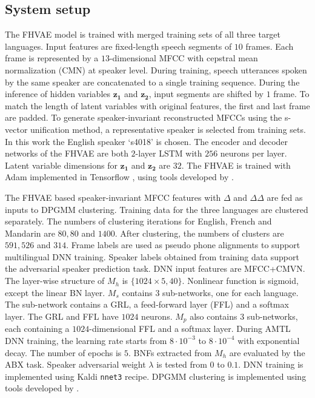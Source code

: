 \documentclass[a4paper]{article}
\begin{document}
\subsection{System setup}
\label{subsec:baseline}
The FHVAE model is trained with merged training sets of all three target languages.
Input features are fixed-length speech segments of $10$ frames. Each frame is represented by a $13$-dimensional MFCC with cepstral mean normalization (CMN) at speaker level. During training, speech utterances spoken by the same speaker are concatenated to a single training sequence. During the inference of hidden variables $\bm{z_1}$ and $\bm{z_2}$, input segments are shifted by $1$ frame. To match the length of latent variables with original features, the first and last frame are padded. 
To generate speaker-invariant reconstructed MFCCs using  the s-vector unification method, a representative speaker  is selected from training sets. In this work the English speaker `s4018' is chosen. The encoder and decoder networks of the FHVAE are both $2$-layer LSTM with $256$ neurons per layer. Latent variable dimensions for $\bm{z_1}$ and $\bm{z_2}$ are $32$. The FHVAE is trained with Adam \cite{kingma2014adam} implemented in Tensorflow \cite{Abadi2016tensorflow}, using tools developed by \cite{hsu2017nips}. 

The FHVAE based speaker-invariant MFCC features with $\Delta$ and $\Delta\Delta$ are fed as inputs to DPGMM clustering. Training data for the three languages are clustered separately. The numbers of clustering iterations for English, French and Mandarin are $80, 80$ and $1400$. After clustering, the numbers of clusters are $591, 526$ and $314$. Frame  labels are used as pseudo phone alignments to support multilingual DNN training. Speaker labels  obtained from training data support the adversarial speaker prediction task. DNN input features are MFCC+CMVN. The layer-wise structure  of   $M_h$ is $\{1024\times 5, 40\}$. Nonlinear function is sigmoid, except the linear BN layer. $M_s$ contains $3$ sub-networks, 
one for each language.
The sub-network contains a GRL, a feed-forward layer (FFL) and a softmax layer. The GRL and FFL have $1024$ neurons. $M_p$ also contains $3$ sub-networks, each containing a $1024$-dimensional FFL and a softmax layer.
During AMTL DNN training, the learning rate starts from $8\cdot 10^{-3}$ to $8\cdot 10^{-4}$ with exponential decay. The number of epochs is $5$. BNFs extracted from $M_h$ are evaluated by the ABX task.
Speaker adversarial weight $\lambda$ is tested from $0$ to $0.1$. DNN training is implemented using Kaldi \cite{povey2011kaldi} \texttt{nnet3} recipe. DPGMM clustering is implemented using tools developed by \cite{chang2013parallel}.
\end{document}
